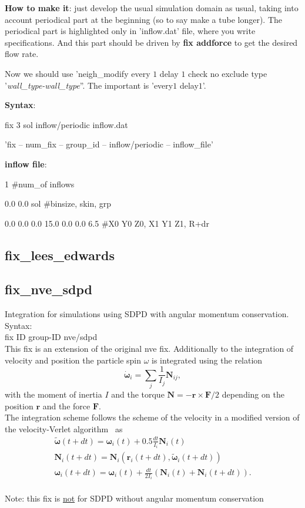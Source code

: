 \textbf{How to make it}: just develop the usual simulation domain as usual, taking into account periodical part at the beginning (so to say make a tube longer). The periodical part is highlighted only in 'inflow.dat' file, where you write specifications. And this part should be driven by \textbf{fix addforce} to get the desired flow rate.

Now we should use 'neigh\_modify    every $1$ delay $1$ check no exclude type '\textit{wall\_type-wall\_type}''. The important is 'every$1$ delay$1$'.

\textbf{Syntax}:

fix    $3$ sol inflow/periodic inflow.dat

'fix -- num\_fix -- group\_id -- inflow/periodic -- inflow\_file' 

\textbf{inflow file}:

1 \#num\_of inflows

0.0 0.0 sol \#binsize, skin, grp

0.0 0.0 0.0 15.0 0.0 0.0 6.5 \#X0 Y0 Z0, X1 Y1 Z1, R+dr

\subsection{fix\_lees\_edwards}


\subsection{fix\_nve\_sdpd}\label{sec:fix/nve/sdpd}

Integration for simulations using SDPD with angular momentum conservation.
\\[2ex]
Syntax:\\[1ex]
fix ID group-ID nve/sdpd
\\[2ex]
This fix is an extension of the original nve fix.
Additionally to the integration of velocity and position the particle spin $\omega$ is integrated using the relation
%
\begin{equation}\label{eq:NEM}
\dot{{\boldsymbol{ \omega}}}_i = \sum_j \frac{1}{I_j}{\mathbf N}_{ij},
\end{equation}
%
with the moment of inertia $I$ and the torque ${\mathbf N} = -{\mathbf r} \times {\mathbf F}/2$ depending on the position ${\mathbf r}$ and the force ${\mathbf F}$.
\\[1ex]
The integration scheme follows the scheme of the velocity in a modified version of the velocity-Verlet algorithm~\cite{Allen_CSL_1991} as 
\begin{eqnarray}
	\tilde{\boldsymbol{\omega}}(t + dt) = \boldsymbol{\omega}_i(t) + 0.5 \frac{dt}{I_i} \mathbf{N}_i(t) \nonumber\\
	\mathbf{N}_i(t + dt) = \mathbf{N}_i(\mathbf{r}_i(t + dt), \tilde{\boldsymbol{\omega}}_i(t+ dt)) \nonumber\\
	\boldsymbol{\omega}_i(t + dt) = \boldsymbol{\omega}_i(t) + \frac{dt}{2 I_i} \left( \mathbf{N}_i(t)+\mathbf{N}_i(t+ dt) \right).
\end{eqnarray}
\\[2ex]
Note: this fix is \underline{not} for SDPD without angular momentum conservation

